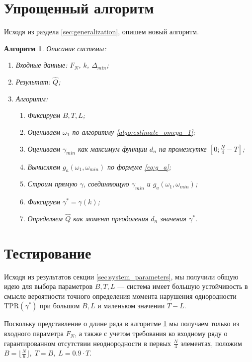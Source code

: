 \documentclass[specialist, substylefile = spbu.rtx,
			   subf, href, 12pt]{disser}
\newtheorem{algorithm}{Алгоритм}
\begin{document}
\section{Упрощенный алгоритм}
Исходя из раздела \ref{sec:generalization}, опишем новый алгоритм.
\begin{algorithm}\label{algo:system_simplification}
	Описание системы:
	\begin{enumerate}
		\item Входные данные: $ F_N $, $ k $, $ \Delta_{min} $;
		\item Результат: $ \hat{Q}$;
		\item Алгоритм:
		\begin{enumerate}
			\item Фиксируем $ B, T, L $;
			\item Оцениваем $ \omega_1 $ по алгоритму \ref{algo:estimate_omega_1};
			\item Оцениваем $ \gamma_{min} $ как максимум функции $ d_n $ на промежутке $ [0; \frac{N}{4} - T] $;
			\item Вычисляем $ g_a(\omega_1, \omega_{min}) $ по формуле \eqref{eq:g_a};
			\item Строим прямую $ \gamma $, соединяющую $ \gamma_{min} $ и $ g_a(\omega_1, \omega_{min}) $;
			\item Фиксируем $ \gamma^* = \gamma(k) $;
			\item Определяем $ \hat{Q} $ как момент преодоления $ d_n $ значения $ \gamma^* $.
		\end{enumerate}
	\end{enumerate}
\end{algorithm}


\section{Тестирование}
Исходя из результатов секции \ref{sec:system_parameters}, мы получили общую идею для выбора параметров $ B, T, L $ --- система имеет большую устойчивость в смысле вероятности точного определения момента нарушения однородности $ \mathrm{TPR}(\gamma^*) $ при большом $ B, L $ и маленьком значении $ T - L $. 

Поскольку представление о длине ряда в алгоритме \ref{algo:system_simplification} мы получаем только из входного параметра $ F_N $, а также с учетом требования ко входному ряду о гарантированном отсутствии неоднородности в первых $ \frac{N}{4} $ элементах, положим $ B = \lfloor \frac{N}{6} \rfloor,\; T = B,\; L = 0.9 \cdot T $.
\end{document}
